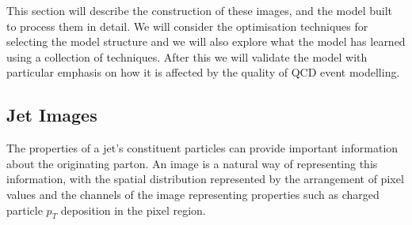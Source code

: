 This section will describe the construction of these images, and the model built to process them in detail. We will consider the optimisation techniques for selecting the model structure and we will also explore what the model has learned using a collection of techniques. After this we will validate the model with particular emphasis on how it is affected by the quality of QCD event modelling. 





\subsection{Jet Images}
The properties of a jet's constituent particles can provide important information about the originating parton. 
An image is a natural way of representing this information, with the spatial distribution represented by the arrangement of pixel values and the channels of the image representing properties such as charged particle $p_{T}$ deposition in the pixel region. 

